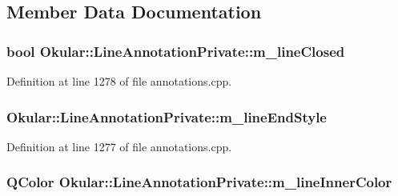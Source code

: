 \subsection{Member Data Documentation}
\hypertarget{classOkular_1_1LineAnnotationPrivate_a907d7a68ff88495dd5d318de5fdf53f3}{
\subsubsection[{m\+\_\+line\+Closed}]{\setlength{\rightskip}{0pt plus 5cm}bool Okular\+::\+Line\+Annotation\+Private\+::m\+\_\+line\+Closed}}\label{classOkular_1_1LineAnnotationPrivate_a907d7a68ff88495dd5d318de5fdf53f3}


Definition at line 1278 of file annotations.\+cpp.

\hypertarget{classOkular_1_1LineAnnotationPrivate_a863fad380ea94af5d61687b7afb9ef4c}{
\subsubsection[{m\+\_\+line\+End\+Style}]{ Okular\+::\+Line\+Annotation\+Private\+::m\+\_\+line\+End\+Style}}\label{classOkular_1_1LineAnnotationPrivate_a863fad380ea94af5d61687b7afb9ef4c}


Definition at line 1277 of file annotations.\+cpp.

\hypertarget{classOkular_1_1LineAnnotationPrivate_a8000d981312a77260058c7bab0523dd0}{
\subsubsection[{m\+\_\+line\+Inner\+Color}]{\setlength{\rightskip}{0pt plus 5cm}Q\+Color Okular\+::\+Line\+Annotation\+Private\+::m\+\_\+line\+Inner\+Color}}\label{classOkular_1_1LineAnnotationPrivate_a8000d981312a77260058c7bab0523dd0}


